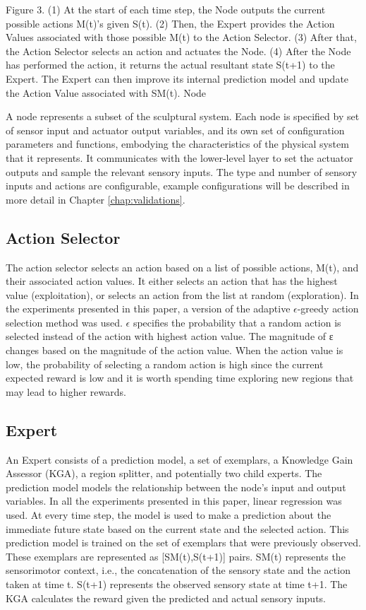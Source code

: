Figure 3.	(1) At the start of each time step, the Node outputs the current possible actions M(t)’s given S(t). (2) Then, the Expert provides the Action Values associated with those possible M(t) to the Action Selector. (3) After that, the Action Selector selects an action and actuates the Node. (4) After the Node has performed the action, it returns the actual resultant state S(t+1) to the Expert. The Expert can then improve its internal prediction model and update the Action Value associated with SM(t). 
Node

A node represents a subset of the sculptural system. Each node is specified by set of sensor input and actuator output variables, and its own set of configuration parameters and functions, embodying the characteristics of the physical system that it represents. It communicates with the lower-level layer to set the actuator outputs and sample the relevant sensory inputs.  The type and number of sensory inputs and actions are configurable, example configurations will be described in more detail in Chapter \ref{chap:validations}.

\subsection{Action Selector}

The action selector selects an action based on a list of possible actions, M(t), and their associated action values. It either selects an action that has the highest value (exploitation), or selects an action from the list at random (exploration). In the experiments presented in this paper, a version of the adaptive \(\epsilon\)-greedy \cite{Tokic2010} action selection method was used. \(\epsilon\) specifies the probability that a random action is selected instead of the action with highest action value. The magnitude of ε changes based on the magnitude of the action value. When the action value is low, the probability of selecting a random action is high since the current expected reward is low and it is worth spending time exploring new regions that may lead to higher rewards.

\subsection{Expert}

An Expert consists of a prediction model, a set of exemplars, a Knowledge Gain Assessor (KGA), a region splitter, and potentially two child experts. 
The prediction model models the relationship between the node's input and output variables. In all the experiments presented in this paper, linear regression was used. At every time step, the model is used to make a prediction about the immediate future state based on the current state and the selected action. This prediction model is trained on the set of exemplars that were previously observed. These exemplars are represented as [SM(t),S(t+1)] pairs. SM(t) represents the sensorimotor context, i.e., the concatenation of the sensory state and the action taken at time t. S(t+1) represents the observed sensory state at time t+1. The KGA calculates the reward given the predicted and actual sensory inputs. 

